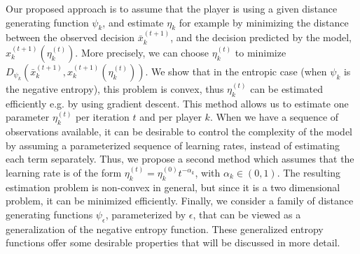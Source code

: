 \documentclass{sig-alternate-ipsn13}
\begin{document}
Our proposed approach is to assume that the player is using a given distance generating function $\psi_k$, and estimate $\eta_k$ for example by minimizing the distance between the observed decision $\bar x^{(t+1)}_k$, and the decision predicted by the model, $x^{(t+1)}_k(\eta_k^{(t)})$. More precisely, we can choose $\eta^{(t)}_k$ to minimize $D_{\psi_k}(\bar x^{(t+1)}_k, x^{(t+1)}_k(\eta_k^{(t)}))$. We show that in the entropic case (when $\psi_k$ is the negative entropy), this problem is convex, thus $\eta_k^{(t)}$ can be estimated efficiently e.g. by using gradient descent. This method allows us to estimate one parameter $\eta_k^{(t)}$ per iteration $t$ and per player $k$. When we have a sequence of observations available, it can be desirable to control the complexity of the model by assuming a parameterized sequence of learning rates, instead of estimating each term separately. Thus, we propose a second method which assumes that the learning rate is of the form $\eta^{(t)}_k = \eta^{(0)}_k t^{-\alpha_k}$, with $\alpha_k \in (0, 1)$. The resulting estimation problem is non-convex in general, but since it is a two dimensional problem, it can be minimized efficiently. Finally, we consider a family of distance generating functions $\psi_\epsilon$, parameterized by $\epsilon$, that can be viewed as a generalization of the negative entropy function. These generalized entropy functions offer some desirable properties that will be discussed in more detail.
\end{document}
